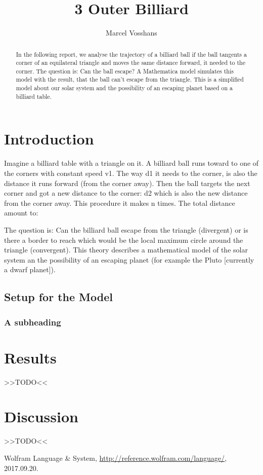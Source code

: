 \documentclass[11pt,a4paper]{article}
\begin{document}
\title{3 Outer Billiard}
\author{Marcel Vosshans}
\maketitle

\begin{abstract}
In the following report, we analyse the trajectory of a billiard ball if the ball tangents a corner of an equilateral triangle and moves the same distance forward, it needed to the corner. The question is: Can the ball escape? A Mathematica model simulates this model with the result, that the ball can’t escape from the triangle. This is a simplified model about our solar system and the possibility of an escaping planet based on a billiard table.
\end{abstract}

\tableofcontents

\section{Introduction}
Imagine a billiard table with a triangle on it. A billiard ball runs toward to one of the corners with constant speed v1. The way d1 it needs to the corner, is also the distance it runs forward (from the corner away). Then the ball targets the next corner and got a new distance to the corner: d2 which is also the new distance from the corner away. This procedure it makes n times. The total distance amount to:



The question is: Can the billiard ball escape from the triangle (divergent) or is there a border to reach which would be the local maximum circle around the triangle (convergent). This theory describes a mathematical model of the solar system an the possibility of an escaping planet (for example the Pluto [currently a dwarf planet]).

	
 	\subsection{Setup for the Model}


  	\subsubsection{A subheading}



\section{Results}
>>TODO<<


\section{Discussion}
>>TODO<<

\begin{thebibliography}{99}

 Wolfram Language \& System, \url{http://reference.wolfram.com/language/}, 2017.09.20.


\end{thebibliography}
\end{document}
